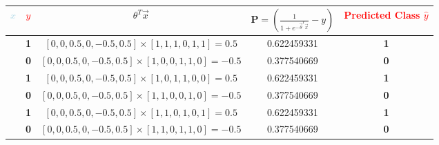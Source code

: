 \begin{table}[H]
	\centering
	\caption{}
	\label{tab:training-5}
	\begin{tabular}{*{5}{|c}|}
		\hline
		\textcolor{lightblue}{$x$} & \textcolor{red}{$y$} & $\theta^{T}\vec{x}$ & $\mathbf{P} = \left( \frac{1}{1 + e^{-\vec{\theta}^{T}\vec{x}} } - y \right) $ & \textcolor{red}{\textbf{Predicted Class} $\hat{y}$}\\
		\hline
		[1, 1, 1, 0, 1, 1] & \textbf{1} & $[0, 0, 0.5, 0, -0.5, 0.5] \times [1, 1, 1, 0, 1, 1] = 0.5$ & 0.622459331 & \textbf{1} \\
		\hline
		[1, 0, 0, 1, 1, 0] & \textbf{0} & $[0, 0, 0.5, 0, -0.5, 0.5] \times [1, 0, 0, 1, 1, 0] = -0.5$ & 0.377540669 & \textbf{0} \\
		\hline
		[1, 0, 1, 1, 0, 0] & \textbf{1} & $[0, 0, 0.5, 0, -0.5, 0.5] \times [1, 0, 1, 1, 0, 0] = 0.5$ & 0.622459331 & \textbf{1} \\
		\hline
		[1, 1, 0, 0, 1, 0] & \textbf{0} & $[0, 0, 0.5, 0, -0.5, 0.5] \times [1, 1, 0, 0, 1, 0] = -0.5$ & 0.377540669 & \textbf{0} \\
		\hline
		[1, 1, 0, 1, 0, 1] & \textbf{1} & $[0, 0, 0.5, 0, -0.5, 0.5] \times [1, 1, 0, 1, 0, 1] = 0.5$ & 0.622459331 & \textbf{1} \\
		\hline
		[1, 1, 0, 1, 1, 0] & \textbf{0} & $[0, 0, 0.5, 0, -0.5, 0.5] \times [1, 1, 0, 1, 1, 0] = -0.5$ & 0.377540669 & \textbf{0} \\
		\hline
	\end{tabular}
\end{table}
